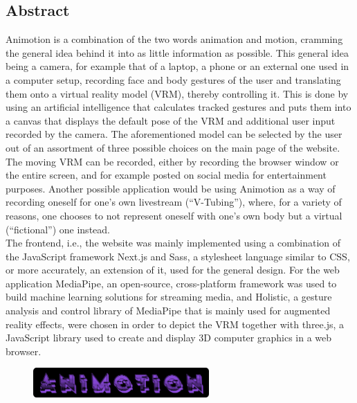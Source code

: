 \begin{spacing}{1}
    \chapter*{Abstract}
\end{spacing}
Animotion is a combination of the two words animation and motion, cramming the general idea behind it into as little information as possible. This general idea being a camera, for example that of a laptop, a phone or an external one used in a computer setup, recording face and body gestures of the user and translating them onto a virtual reality model (VRM), thereby controlling it. This is done by using an artificial intelligence that calculates tracked gestures and puts them into a canvas that displays the default pose of the VRM and additional user input recorded by the camera. The aforementioned model can be selected by the user out of an assortment of three possible choices on the main page of the website. The moving VRM can be recorded, either by recording the browser window or the entire screen, and for example posted on social media for entertainment purposes. Another possible application would be using Animotion as a way of recording oneself for one's own livestream (“V-Tubing”), where, for a variety of reasons, one chooses to not represent oneself with one's own body but a virtual (“fictional”) one instead.
\\
The frontend, i.e., the website was mainly implemented using a combination of the JavaScript framework Next.js and Sass, a stylesheet language similar to CSS, or more accurately, an extension of it, used for the general design. For the web application MediaPipe, an open-source, cross-platform framework was used to build machine learning solutions for streaming media, and Holistic, a gesture analysis and control library of MediaPipe that is mainly used for augmented reality effects, were chosen in order to depict the VRM together with three.js, a JavaScript library used to create and display 3D computer graphics in a web browser.
\\
\begin{figure}[htb]
    \centering
    \includegraphics[width=0.6\textwidth]{pics/animotionlogo.png}
\end{figure}

